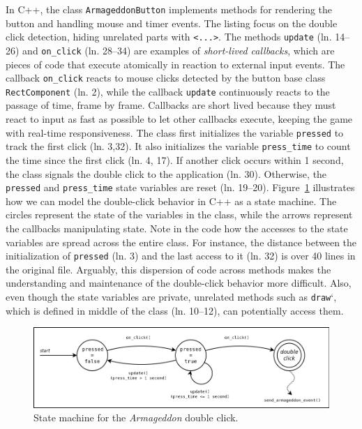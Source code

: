 \documentclass{vgtc}                          %
\newcommand{\code}[1] {{\small{\texttt{#1}}}}
\begin{document}
In C++, the class \code{ArmageddonButton} implements methods for rendering the
button and handling mouse and timer events.
The listing focus on the double click detection, hiding unrelated parts with
\code{<...>}.
%
The methods \code{update} (ln. 14--26) and \code{on\_click} (ln. 28--34) are
examples of \emph{short-lived callbacks}, which are pieces of code that execute
atomically in reaction to external input events.
The callback \code{on\_click} reacts to mouse clicks detected by the button
base class \code{RectComponent} (ln. 2), while the callback \code{update}
continuously reacts to the passage of time, frame by frame.
Callbacks are short lived because they must react to input as fast as possible
to let other callbacks execute, keeping the game with real-time responsiveness.
%
The class first initializes the variable \code{pressed} to track the first
click (ln. 3,32).
It also initializes the variable \code{press\_time} to count the time since the
first click (ln. 4, 17).
If another click occurs within 1 second, the class signals the double click to
the application (ln. 30).
Otherwise, the \code{pressed} and \code{press\_time} state variables are reset
(ln. 19--20). 
%
Figure~\ref{fig.armageddon.fsm} illustrates how we can model the double-click 
behavior in C++ as a state machine.
The circles represent the state of the variables in the class, while the arrows 
represent the callbacks manipulating state.
%
Note in the code how the accesses to the state variables are spread
across the entire class.
For instance, the distance between the initialization of \code{pressed} (ln.
3) and the last access to it (ln. 32) is over 40 lines in the original file.
Arguably, this dispersion of code across methods makes the understanding and 
maintenance of the double-click behavior more difficult.
Also, even though the state variables are private, unrelated methods such as 
\code{draw}`, which is defined in middle of the class (ln. 10--12), can
potentially access them.

\begin{figure}
\centering
\includegraphics[width=\columnwidth]{double-click}
\caption{State machine for the \emph{Armageddon} double click.
\label{fig.armageddon.fsm}
}
\end{figure}
\end{document}
